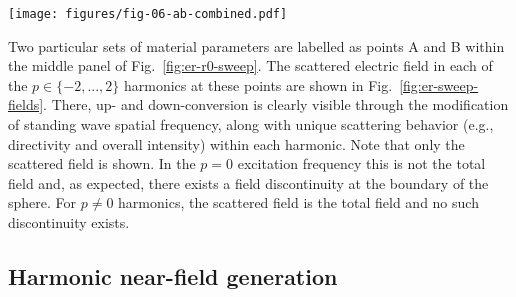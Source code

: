 \documentclass[article]{IEEEtran}
\newcommand{\T}[1]{\mathrm{#1}}
\begin{document}
\begin{figure*}
\centering
\texttt{[image: figures/fig-06-ab-combined.pdf]}
\caption{Normalized scattered electric field $E^\T{s}_\phi$ magnitude produced by a sphere of radius $ka = 2\pi$ with core relative permittivity $\varepsilon_\T{r}$ and surface resistance defined by $r(t) = r_0(1+\gamma\cos\omega_\sigma  t)$ with $\omega_\sigma = 1.5\omega_0$ and $\gamma = 0.9$. Results for two pairs of parameters $(\varepsilon_\T{r},r_0)$ are shown corresponding to the labeled points ``A'' (top, $\varepsilon_\T{r} = 1, r_0/\eta = 2$) and ``B'' (bottom, $\varepsilon_\T{r} = 2.45, r_0/\eta = 2$) in Fig.~\ref{fig:er-r0-sweep}.  Scale bars in the bottom row indicate the free-space wavelength at each harmonic, valid for both rows of data.}
\label{fig:er-sweep-fields}
\vspace*{4pt}
\hrulefill
\vspace*{4pt}
\end{figure*}

Two particular sets of material parameters are labelled as points A and B within the middle panel of Fig.~\ref{fig:er-r0-sweep}.  The scattered electric field in each of the $p\in\{-2,...,2\}$ harmonics at these points are shown in Fig.~\ref{fig:er-sweep-fields}.  There, up- and down-conversion is clearly visible through the modification of standing wave spatial frequency, along with unique scattering behavior (e.g., directivity and overall intensity) within each harmonic.  Note that only the scattered field is shown.  In the $p=0$ excitation frequency this is not the total field and, as expected, there exists a field discontinuity at the boundary of the sphere.  For $p\neq0$ harmonics, the scattered field is the total field and no such discontinuity exists.





\subsection{Harmonic near-field generation}
\end{document}
